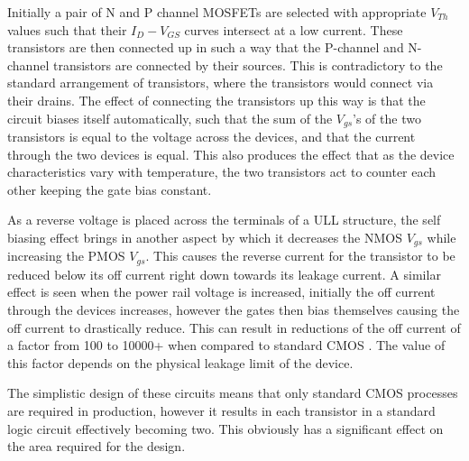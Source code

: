Initially a pair of N and P channel MOSFETs are selected with appropriate $V_{Th}$ values such that their $I_{D}-V_{GS}$ curves intersect at a low current.
These transistors are then connected up in such a way that the P-channel and N-channel transistors are connected by their sources.
This is contradictory to the standard arrangement of transistors, where the transistors would connect via their drains.
The effect of connecting the transistors up this way is that the circuit biases itself automatically, such that the sum of the $V_{gs}$'s of the two transistors is equal to the voltage across the devices, and that the current through the two devices is equal.
This also produces the effect that as the device characteristics vary with temperature, the two transistors act to counter each other keeping the gate bias constant.

As a reverse voltage is placed across the terminals of a \ac{ULL} structure, the self biasing effect brings in another aspect by which it decreases the NMOS $V_{gs}$ while increasing the PMOS $V_{gs}$.
This causes the reverse current for the transistor to be reduced below its off current right down towards its leakage current.
A similar effect is seen when the power rail voltage is increased, initially the off current through the devices increases, however the gates then bias themselves causing the off current to drastically reduce.
This can result in reductions of the off current of a factor from 100 to 10000+ when compared to standard CMOS \cite{ULL-AandD,DisruptiveULL}.
The value of this factor depends on the physical leakage limit of the device.

The simplistic design of these circuits means that only standard CMOS processes are required in production, however it results in each transistor in a standard logic circuit effectively becoming two.
This obviously has a significant effect on the area required for the design.
